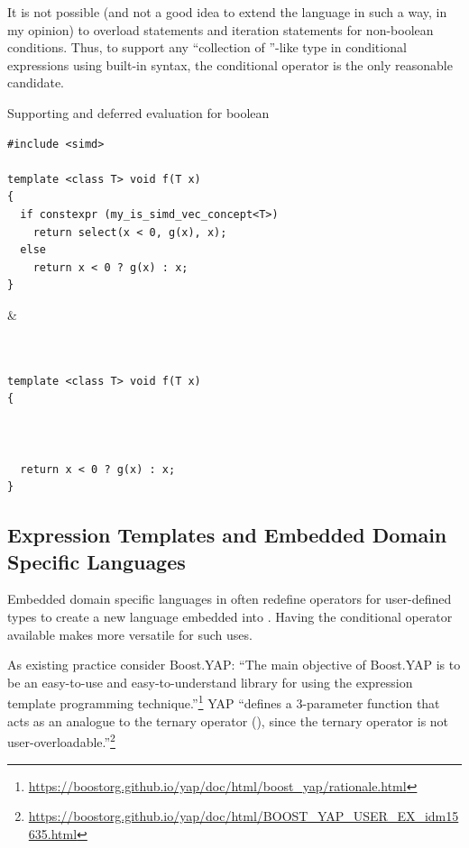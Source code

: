 It is not possible (and not a good idea to extend the language in such a way, in my opinion) to overload  statements and iteration statements for non-boolean conditions.
Thus, to support any “collection of \bool{}”-like type in conditional expressions using built-in syntax, the conditional operator is the only reasonable candidate.

\begin{tonytable}
{Supporting  and deferred evaluation for boolean }
\label{tt:blending}
\begin{lstlisting}
#include <simd>

template <class T> void f(T x)
{
  if constexpr (my_is_simd_vec_concept<T>)
    return select(x < 0, g(x), x);
  else
    return x < 0 ? g(x) : x;
}
\end{lstlisting}
&
\begin{lstlisting}


template <class T> void f(T x)
{



  return x < 0 ? g(x) : x;
}
\end{lstlisting}
\end{tonytable}

\subsection{Expression Templates and Embedded Domain Specific Languages}
Embedded domain specific languages in \CC{} often redefine operators for user-defined types to create a new language embedded into \CC{}.
Having the conditional operator available makes \CC{} more versatile for such uses.

As existing practice consider Boost.YAP:
“The main objective of Boost.YAP is to be an easy-to-use and easy-to-understand library for using the expression template programming technique.”\footnote{\url{https://boostorg.github.io/yap/doc/html/boost_yap/rationale.html}}
YAP “defines a 3-parameter function  that acts as an analogue to the ternary operator (), since the ternary operator is not user-overloadable.”\footnote{\url{https://boostorg.github.io/yap/doc/html/BOOST_YAP_USER_EX_idm15635.html}}

